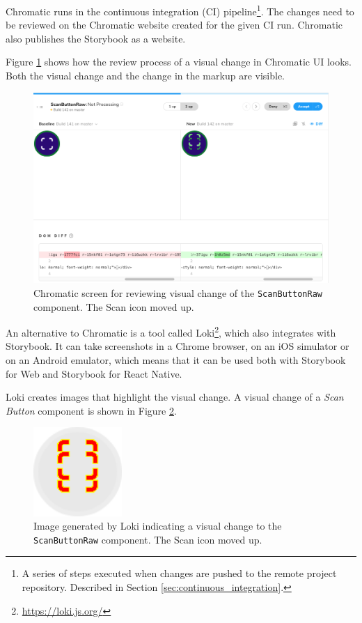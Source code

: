 \documentclass[
  digital, %
  table,   %
  oneside, %
  lof,     %
  lot,     %
]{fithesis3}
\begin{document}
Chromatic runs in the continuous integration (CI) pipeline\footnote{A series of steps executed when changes are pushed to the remote project repository. Described in Section \ref{sec:continuous_integration}.}. The changes need to be reviewed on the Chromatic website created for the given CI run. Chromatic also publishes the Storybook as a website.

Figure \ref{fig:chromatic_diff} shows how the review process of a visual change in Chromatic UI looks. Both the visual change and the change in the markup are visible.

\begin{figure}
    \begin{center}
        \includegraphics[width=\textwidth]{figures/other/chromatic_diff}
    \end{center}
    \caption{Chromatic screen for reviewing visual change of the \texttt{ScanButtonRaw} component. The Scan icon moved up.}
    \label{fig:chromatic_diff}
\end{figure}

An alternative to Chromatic is a tool called Loki\footnote{\url{https://loki.js.org/}}, which also integrates with Storybook. It can take screenshots in a Chrome browser, on an iOS simulator or on an Android emulator, which means that it can be used both with Storybook for Web and Storybook for React Native.

Loki creates images that highlight the visual change. A visual change of a \textit{Scan Button} component is shown in Figure \ref{fig:loki_diff}.

\begin{figure}
    \begin{center}
        \includegraphics[width=0.3\textwidth]{figures/other/loki_diff}
    \end{center}
    \caption{Image generated by Loki indicating a visual change to the \texttt{ScanButtonRaw} component. The Scan icon moved up.}
    \label{fig:loki_diff}
\end{figure}
\end{document}

